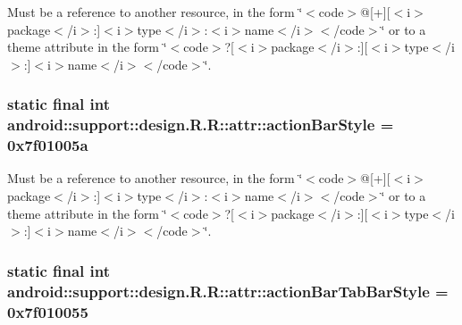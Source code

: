 Must be a reference to another resource, in the form \char`\"{}$<$code$>$@\mbox{[}+\mbox{]}\mbox{[}$<$i$>$package$<$/i$>$:\mbox{]}$<$i$>$type$<$/i$>$:$<$i$>$name$<$/i$>$$<$/code$>$\char`\"{} or to a theme attribute in the form \char`\"{}$<$code$>$?\mbox{[}$<$i$>$package$<$/i$>$:\mbox{]}\mbox{[}$<$i$>$type$<$/i$>$:\mbox{]}$<$i$>$name$<$/i$>$$<$/code$>$\char`\"{}. \hypertarget{classandroid_1_1support_1_1design_1_1_r_1_1attr_178542b26e1ac0e87c99518e83658c9a}{
\subsubsection[{actionBarStyle}]{\setlength{\rightskip}{0pt plus 5cm}static final int android::support::design.R.R::attr::actionBarStyle = 0x7f01005a}}
\label{classandroid_1_1support_1_1design_1_1_r_1_1attr_178542b26e1ac0e87c99518e83658c9a}


Must be a reference to another resource, in the form \char`\"{}$<$code$>$@\mbox{[}+\mbox{]}\mbox{[}$<$i$>$package$<$/i$>$:\mbox{]}$<$i$>$type$<$/i$>$:$<$i$>$name$<$/i$>$$<$/code$>$\char`\"{} or to a theme attribute in the form \char`\"{}$<$code$>$?\mbox{[}$<$i$>$package$<$/i$>$:\mbox{]}\mbox{[}$<$i$>$type$<$/i$>$:\mbox{]}$<$i$>$name$<$/i$>$$<$/code$>$\char`\"{}. \hypertarget{classandroid_1_1support_1_1design_1_1_r_1_1attr_b0421973a579a5d8cbde1a6e8b8b686b}{
\subsubsection[{actionBarTabBarStyle}]{\setlength{\rightskip}{0pt plus 5cm}static final int android::support::design.R.R::attr::actionBarTabBarStyle = 0x7f010055}}
\label{classandroid_1_1support_1_1design_1_1_r_1_1attr_b0421973a579a5d8cbde1a6e8b8b686b}


